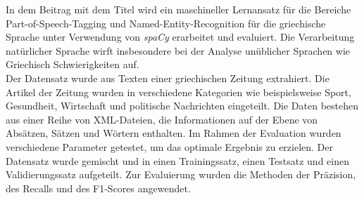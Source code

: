 In dem Beitrag mit dem Titel \cite{partalidou2019design} wird ein maschineller Lernansatz für die Bereiche Part-of-Speech-Tagging und Named-Entity-Recognition für die griechische Sprache unter Verwendung von \emph{spaCy} erarbeitet und evaluiert. Die Verarbeitung natürlicher Sprache wirft insbesondere bei der Analyse unüblicher Sprachen wie Griechisch Schwierigkeiten auf.\\ Der Datensatz wurde aus Texten einer griechischen Zeitung extrahiert. Die Artikel der Zeitung wurden in verschiedene Kategorien wie beispielsweise Sport, Gesundheit, Wirtschaft und politische Nachrichten eingeteilt. Die Daten bestehen aus einer Reihe von XML-Dateien, die Informationen auf der Ebene von Absätzen, Sätzen und Wörtern enthalten. Im Rahmen der Evaluation wurden verschiedene Parameter getestet, um das optimale Ergebnis zu erzielen. Der Datensatz wurde gemischt und in einen Trainingssatz, einen Testsatz und einen Validierungssatz aufgeteilt. Zur Evaluierung wurden die Methoden der Präzision, des Recalls und des F1-Scores angewendet.




\newpage





